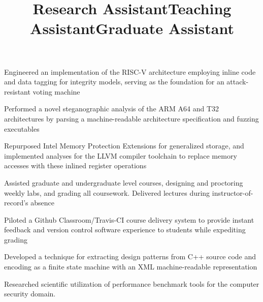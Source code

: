 \documentclass[line]{res}
\begin{document}
\begin{resume}
\title{\bf Research Assistant}
\begin{position}
\vspace*{-.2cm}
\begin{list2}
	\item Engineered an implementation of the RISC-V architecture employing inline code and data tagging for integrity models, serving as the foundation for an attack-resistant voting machine
	\item Performed a novel steganographic analysis of the ARM A64 and T32 architectures by parsing a machine-readable architecture specification and fuzzing executables
	\item Repurposed Intel Memory Protection Extensions for generalized storage, and implemented analyses for the LLVM compiler toolchain to replace memory accesses with these inlined register operations
\end{list2}
\end{position}

\title{\bf Teaching Assistant}
\begin{position}
\vspace*{-.2cm}
\begin{list2}
	\item Assisted graduate and undergraduate level courses, designing and proctoring weekly labs, and grading all coursework. Delivered lectures during instructor-of-record's absence
	\item Piloted a Github Classroom/Travis-CI course delivery system to provide instant feedback and version control software experience to students while expediting grading
\end{list2}
\end{position}

\title{Graduate Assistant}
\begin{position}
\vspace*{-.2cm}
\begin{list2}
	\item Developed a technique for extracting design patterns from C++ source code and encoding as a finite state machine with an XML machine-readable representation
	\item Researched scientific utilization of performance benchmark tools for the computer security domain.
\end{list2}
\end{position}


\end{resume}
\end{document}
